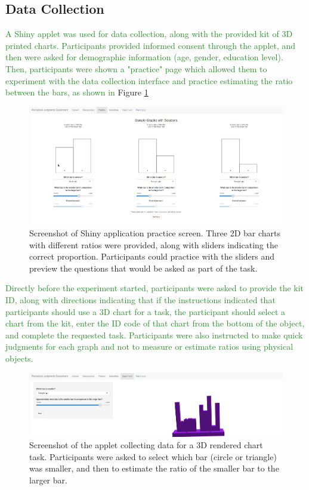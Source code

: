 \documentclass[letterpaper,inpress,dvipsnames]{jdsart}
\begin{document}
\hypertarget{data-collection}{%
\subsection{Data Collection}\label{data-collection}}

{\textcolor{ForestGreen}{A Shiny applet was used for data collection, along with the provided kit of 3D printed charts.
Participants provided informed consent through the applet, and then were asked for demographic information (age, gender, education level). 
Then, participants were shown a "practice" page which allowed them to experiment with the data collection interface and practice estimating the ratio between the bars, as shown in}} Figure \ref{fig:practice}

\begin{figure}
\includegraphics[width=6.4in]{03-Practice-2} \caption{Screenshot of Shiny application practice screen. Three 2D bar charts with different ratios were provided, along with sliders indicating the correct proportion. Participants could practice with the sliders and preview the questions that would be asked as part of the task.}\label{fig:practice}
\end{figure}

{\textcolor{ForestGreen}{Directly before the experiment started, participants were asked to provide the kit ID, along with directions indicating that if the instructions indicated that participants should use a 3D chart for a task, the participant should select a chart from the kit, enter the ID code of that chart from the bottom of the object, and complete the requested task.
Participants were also instructed to make quick judgments for each graph and not to measure or estimate ratios using physical objects.}}

\begin{figure}
\includegraphics[width=6.4in]{05-Experiment-05-filled-in} \caption{Screenshot of the applet collecting data for a 3D rendered chart task. Participants were asked to select which bar (circle or triangle) was smaller, and then to estimate the ratio of the smaller bar to the larger bar.}\label{fig:experiment3dRender}
\end{figure}
\end{document}
